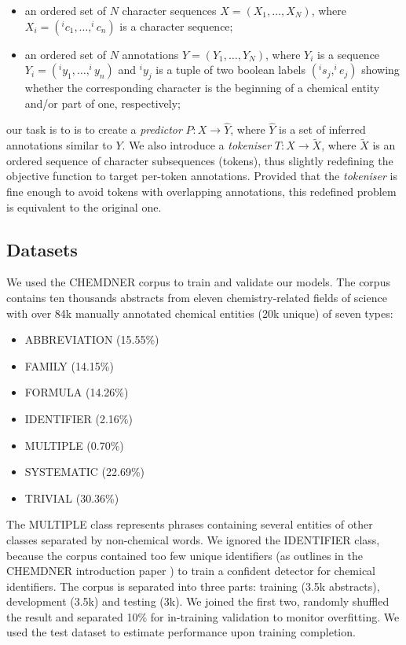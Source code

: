 \documentclass[twocolumn]{bmcart}%
\begin{document}
\begin{itemize}
	\item an ordered set of $N$ character sequences $X = ( {X}_{1}, \dots, {X}_{N} )$, where ${X}_{i} = ( ^{i}{c}_{1}, \dots, ^{i}{c}_{n} )$ is a character sequence;
	\item an ordered set of $N$ annotations $Y = ( {Y}_{1}, \dots, {Y}_{N} )$, where ${Y}_{i}$ is a sequence ${Y}_{i} = ( ^{i}{y}_{1}, \dots, ^{i}{y}_{n} )$ and $^{i}{y}_{j}$ is a tuple of two boolean labels $(^{i}{s}_{j}, ^{i}{e}_{j})$ showing whether the corresponding character is the beginning of a chemical entity and/or part of one, respectively;
\end{itemize}
our task is to is to create a \textit{predictor} $P: X \rightarrow \hat{Y}$, where $\hat{Y}$ is a set of inferred annotations similar to ${Y}$.
We also introduce a \textit{tokeniser} $T: X \rightarrow \tilde{X}$, where $\tilde{X}$ is an ordered sequence of character subsequences (tokens), thus slightly redefining the objective function to target per-token annotations.
Provided that the \textit{tokeniser} is fine enough to avoid tokens with overlapping annotations, this redefined problem is equivalent to the original one.

\subsection*{Datasets}

We used the CHEMDNER corpus \cite{Krallinger2015} to train and validate our models. The corpus contains ten thousands abstracts from eleven chemistry-related fields of science with over 84k manually annotated chemical entities (20k unique) of seven types: 
\begin{itemize}
	\item ABBREVIATION (15.55\%)
	\item FAMILY (14.15\%)
	\item FORMULA (14.26\%)
	\item IDENTIFIER (2.16\%) 
	\item MULTIPLE (0.70\%)
	\item SYSTEMATIC (22.69\%)
	\item TRIVIAL (30.36\%)
\end{itemize}
The MULTIPLE class represents phrases containing several entities of other classes separated by non-chemical words.
We ignored the IDENTIFIER class, because the corpus contained too few unique identifiers (as outlines in the CHEMDNER introduction paper \cite{Krallinger2015}) to train a confident detector for chemical identifiers.
The corpus is separated into three parts: training (3.5k abstracts), development (3.5k) and testing (3k).
We joined the first two, randomly shuffled the result and separated 10\% for in-training validation to monitor overfitting.
We used the test dataset to estimate performance upon training completion.
\end{document}
